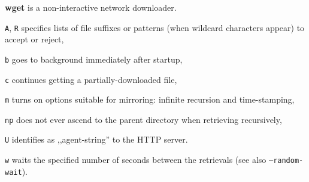 \textbf{wget} is a non-interactive network downloader.
\begin{enumx}
	\item [\texttt{A}, \texttt{R}] specifies lists 	of file suffixes or 
	patterns (when wildcard characters appear) to accept or reject,
	\item [\texttt{b}] goes to background immediately after startup,
	\item [\texttt{c}] continues getting a partially-downloaded file,
	\item [\texttt{m}] turns on options suitable for mirroring: 
	infinite recursion and time-stamping,
	\item [\texttt{np}] does not ever ascend to the
	parent directory when retrieving recursively,
	\item [\texttt{U}] identifies as ,,agent-string'' to the HTTP server.
	\item [\texttt{w}] waits the specified number of seconds 
	between the retrievals (see also \texttt{--random-wait}).
\end{enumx}